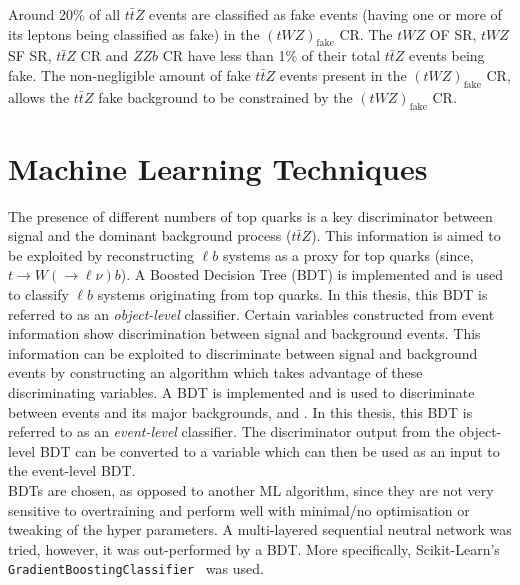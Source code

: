 Around 20$\%$ of all $t\bar{t}Z$ events are classified as fake events (having one or more of its leptons being classified as fake) in the $(tWZ)_{\text{fake}}$ CR. The $tWZ$ OF SR, $tWZ$ SF SR, $t\bar{t}Z$ CR and $ZZb$ CR have less than 1$\%$ of their total $t\bar{t}Z$ events being fake. The non-negligible amount of fake $t\bar{t}Z$ events present in the $(tWZ)_{\text{fake}}$ CR, allows the $t\bar{t}Z$ fake background to be constrained by the $(tWZ)_{\text{fake}}$ CR.


\section{Machine Learning Techniques}
The presence of different numbers of top quarks is a key discriminator between signal and the dominant background process ($t\bar{t}Z$). This information is aimed to be exploited by reconstructing $\ell b$ systems as a proxy for top quarks (since, $t\rightarrow W(\rightarrow \ell \nu) b$). A Boosted Decision Tree (BDT) is implemented and is used to classify $\ell b$ systems originating from top quarks. In this thesis, this BDT is referred to as an \textit{object-level} classifier. Certain variables constructed from event information show discrimination between signal and background events. This information can be exploited to discriminate between signal and background events by constructing an algorithm which takes advantage of these discriminating variables. A BDT is implemented and is used to discriminate between \tWZ events and its major backgrounds, \ttZ and \ZZ. In this thesis, this BDT is referred to as an \textit{event-level} classifier. The discriminator output from the object-level BDT can be converted to a variable which can then be used as an input to the event-level BDT.\\

BDTs are chosen, as opposed to another ML algorithm, since they are not very sensitive to overtraining and perform well with minimal/no optimisation or tweaking of the hyper parameters. A multi-layered sequential neutral network was tried, however, it was out-performed by a BDT. More specifically, Scikit-Learn's \texttt{GradientBoostingClassifier}~\cite{scikit-bdt} was used.
